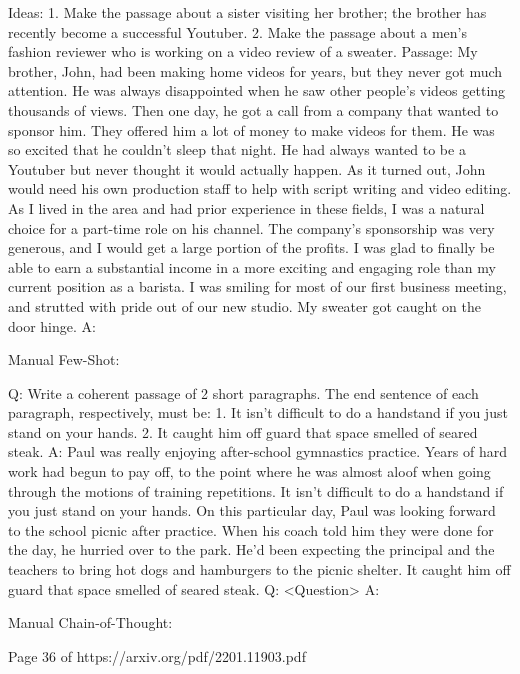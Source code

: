 \documentclass[11pt]{article}
\begin{document}
Ideas:
1. Make the passage about a sister visiting her brother; the brother has recently become a successful Youtuber.
2. Make the passage about a men's fashion reviewer who is working on a video review of a sweater.
Passage:
My brother, John, had been making home videos for years, but they never got much attention. He was always disappointed when he saw other people's videos getting thousands of views. Then one day, he got a call from a company that wanted to sponsor him. They offered him a lot of money to make videos for them. He was so excited that he couldn't sleep that night. He had always wanted to be a Youtuber but never thought it would actually happen.
As it turned out, John would need his own production staff to help with script writing and video editing. As I lived in the area and had prior experience in these fields, I was a natural choice for a part-time role on his channel. The company's sponsorship was very generous, and I would get a large portion of the profits. I was glad to finally be able to earn a substantial income in a more exciting and engaging role than my current position as a barista. I was smiling for most of our first business meeting, and strutted with pride out of our new studio. My sweater got caught on the door hinge.
A: 
  
Manual Few-Shot:

Q: Write a coherent passage of 2 short paragraphs. The end sentence of each paragraph, respectively, must be: 1. It isn't difficult to do a handstand if you just stand on your hands. 2. It caught him off guard that space smelled of seared steak.
A: Paul was really enjoying after-school gymnastics practice. Years of hard work had begun to pay off, to the point where he was almost aloof when going through the motions of training repetitions. It isn't difficult to do a handstand if you just stand on your hands.
On this particular day, Paul was looking forward to the school picnic after practice. When his coach told him they were done for the day, he hurried over to the park. He'd been expecting the principal and the teachers to bring hot dogs and hamburgers to the picnic shelter. It caught him off guard that space smelled of seared steak.
Q: <Question>
A: 

Manual Chain-of-Thought:

Page 36 of https://arxiv.org/pdf/2201.11903.pdf
\end{document}
